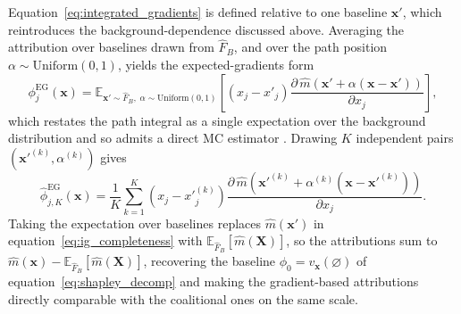   \noindent
  Equation~\eqref{eq:integrated_gradients} is defined relative to one
  baseline \(\mathbf{x}'\), which reintroduces the background-dependence
  discussed above. Averaging the attribution over baselines drawn from
  \(\widehat{F}_{B}\), and over the path position
  \(\alpha\sim\mathrm{Uniform}(0,1)\), yields the expected-gradients form
  \begin{equation}
  \label{eq:expected_gradients}
      \phi^{\mathrm{EG}}_{j}(\mathbf{x})
      =
      \mathbb{E}_{\mathbf{x}'\sim\widehat{F}_{B},\;
                  \alpha\sim\mathrm{Uniform}(0,1)}
      \!\left[
          \left(
              x_{j}-x'_{j}
          \right)
          \frac{\partial\,\widehat{m}
          \!\left(
              \mathbf{x}'+\alpha(\mathbf{x}-\mathbf{x}')
          \right)}
          {\partial x_{j}}
      \right],
  \end{equation}
  which restates the path integral as a single expectation over the
  background distribution and so admits a direct MC estimator
  \citep{erion2021improving}. Drawing \(K\) independent pairs
  \(\left(\mathbf{x}'^{(k)},\alpha^{(k)}\right)\) gives
  \begin{equation}
  \label{eq:expected_gradients_estimator}
      \widehat{\phi}^{\mathrm{EG}}_{j,K}(\mathbf{x})
      =
      \frac{1}{K}
      \sum_{k=1}^{K}
      \left(
          x_{j}-x'^{(k)}_{j}
      \right)
      \frac{\partial\,\widehat{m}
      \!\left(
          \mathbf{x}'^{(k)}+\alpha^{(k)}(\mathbf{x}-\mathbf{x}'^{(k)})
      \right)}
      {\partial x_{j}} .
  \end{equation}
  Taking the expectation over baselines replaces
  \(\widehat{m}(\mathbf{x}')\) in equation~\eqref{eq:ig_completeness} with
  \(\mathbb{E}_{\widehat{F}_{B}}[\widehat{m}(\mathbf{X})]\), so the
  attributions sum to
  \(\widehat{m}(\mathbf{x})-\mathbb{E}_{\widehat{F}_{B}}[\widehat{m}(\mathbf{X})]\),
  recovering the baseline \(\phi_{0}=v_{\mathbf{x}}(\varnothing)\) of
  equation~\eqref{eq:shapley_decomp} and making the gradient-based
  attributions directly comparable with the coalitional ones on the same
  scale.

